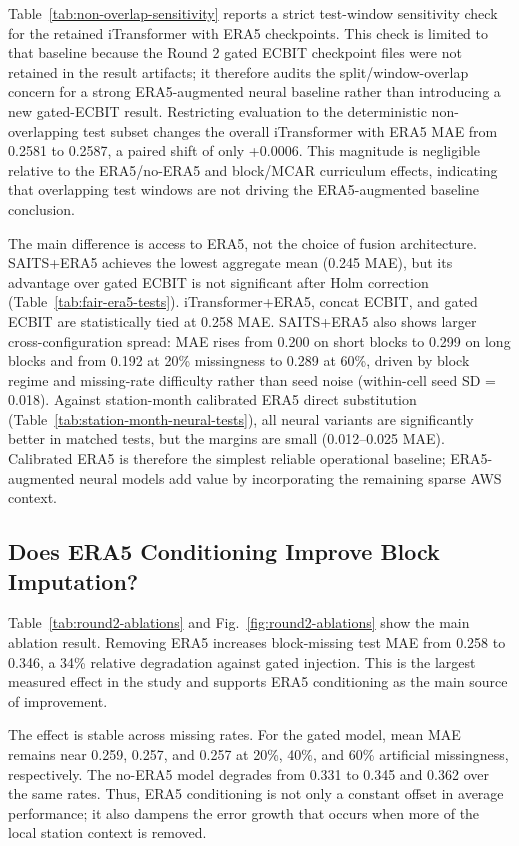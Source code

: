 Table~\ref{tab:non-overlap-sensitivity} reports a strict test-window sensitivity check for the retained iTransformer with ERA5 checkpoints. This check is limited to that baseline because the Round 2 gated ECBIT checkpoint files were not retained in the result artifacts; it therefore audits the split/window-overlap concern for a strong ERA5-augmented neural baseline rather than introducing a new gated-ECBIT result. Restricting evaluation to the deterministic non-overlapping test subset changes the overall iTransformer with ERA5 MAE from 0.2581 to 0.2587, a paired shift of only +0.0006. This magnitude is negligible relative to the ERA5/no-ERA5 and block/MCAR curriculum effects, indicating that overlapping test windows are not driving the ERA5-augmented baseline conclusion.

The main difference is access to ERA5, not the choice of fusion architecture. SAITS+ERA5 achieves the lowest aggregate mean (0.245 MAE), but its advantage over gated ECBIT is not significant after Holm correction (Table~\ref{tab:fair-era5-tests}). iTransformer+ERA5, concat ECBIT, and gated ECBIT are statistically tied at 0.258 MAE. SAITS+ERA5 also shows larger cross-configuration spread: MAE rises from 0.200 on short blocks to 0.299 on long blocks and from 0.192 at 20\% missingness to 0.289 at 60\%, driven by block regime and missing-rate difficulty rather than seed noise (within-cell seed SD = 0.018). Against station-month calibrated ERA5 direct substitution (Table~\ref{tab:station-month-neural-tests}), all neural variants are significantly better in matched tests, but the margins are small (0.012--0.025 MAE). Calibrated ERA5 is therefore the simplest reliable operational baseline; ERA5-augmented neural models add value by incorporating the remaining sparse AWS context.

\subsection{Does ERA5 Conditioning Improve Block Imputation?}
Table~\ref{tab:round2-ablations} and Fig.~\ref{fig:round2-ablations} show the main ablation result. Removing ERA5 increases block-missing test MAE from 0.258 to 0.346, a 34\% relative degradation against gated injection. This is the largest measured effect in the study and supports ERA5 conditioning as the main source of improvement.

The effect is stable across missing rates. For the gated model, mean MAE remains near 0.259, 0.257, and 0.257 at 20\%, 40\%, and 60\% artificial missingness, respectively. The no-ERA5 model degrades from 0.331 to 0.345 and 0.362 over the same rates. Thus, ERA5 conditioning is not only a constant offset in average performance; it also dampens the error growth that occurs when more of the local station context is removed.

